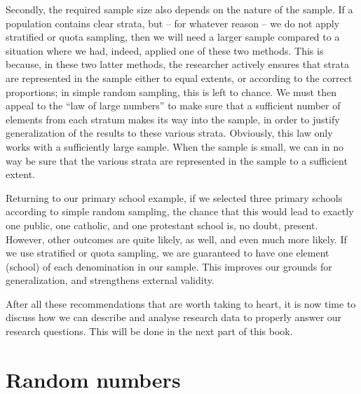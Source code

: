 \documentclass[
]{book}
\begin{document}
Secondly, the required sample size also depends on the nature of the sample. If a population contains clear strata, but -- for whatever reason -- we do not apply stratified or quota sampling, then we will need a larger sample compared to a situation where we had, indeed, applied one of these two methods. This is because, in these two latter methods, the researcher actively ensures that strata are represented in the sample either to equal extents, or according to the correct proportions; in simple random sampling, this is left to chance. We must then appeal to the ``law of large numbers'' to make sure that a sufficient number of elements from each stratum makes its way into the sample, in order to justify generalization of the results to these various strata. Obviously, this law only works with a sufficiently large sample. When the sample is small, we can in no way be sure that the various strata are represented in the sample to a sufficient extent.

Returning to our primary school example, if we selected three primary schools according to simple random sampling, the chance that this would lead to exactly one public, one catholic, and one protestant school is, no doubt, present. However, other outcomes are quite likely, as well, and even much more likely. If we use stratified or quota sampling, we are guaranteed to have one element (school) of each denomination in our sample. This improves our grounds for generalization, and strengthens external validity.

After all these recommendations that are worth taking to heart, it is now time to discuss how we can describe and analyse research data to properly answer our research questions. This will be done in the next part of this book.

\hypertarget{appendix-appendices}{%
\appendix}


\hypertarget{app:randomnumbers}{%
\chapter{Random numbers}\label{app:randomnumbers}}
\end{document}
